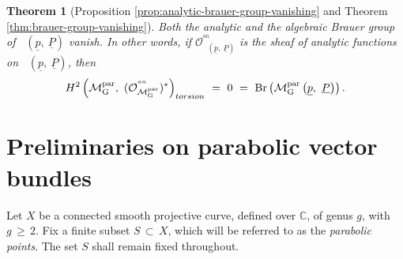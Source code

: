 \documentclass[10pt,reqno]{amsart}
\DeclareMathOperator{\Br}{\textnormal{Br}}
\DeclareMathOperator{\mgpar}{\mc{M}_G^{par}}
\newcommand{\mc}[1]{\mathcal{#1}}
\newcommand{\bb}[1]{\mathbb{#1}}
\newtheorem{theorem}{Theorem}[section]
\theoremstyle{myroman}
\numberwithin{equation}{section}
\begin{document}
	\begin{theorem}[{Proposition \ref{prop:analytic-brauer-group-vanishing} and Theorem
			\ref{thm:brauer-group-vanishing}}]
		Both the analytic and the algebraic Brauer group of $\mgpar\left(\underline{p}, \ \underline{P}\right)$ vanish.
		In other words, if $\mc{O}^{^{an}}_{\mgpar\left(\underline{p}, \ \underline{P}\right)}$ is
		the sheaf of analytic functions on $\mgpar\left(\underline{p}, \ \underline{P}\right)$, then
		$$H^2\left(\mgpar,\ (\mc{O}^{^{an}}_{\mgpar})^*\right)_{torsion}\ =\ 0\ =\
		\Br\left(\mgpar\left(\underline{p}, \ \underline{P}\right)\right).$$
	\end{theorem}
	
	\section{Preliminaries on parabolic vector bundles}\label{section:preliminaries}
	
	Let $X$ be a connected smooth projective curve, defined over $\bb{C}$, of genus $g$, with $g\,\geq\, 2$. Fix a 
	finite subset $S\,\subset\, X$, which will be referred to as the \textit{parabolic points}. The set 
	$S$ shall remain fixed throughout.
	
\end{document}
